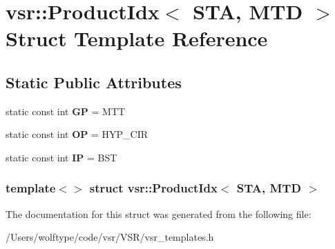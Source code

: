 \hypertarget{structvsr_1_1_product_idx_3_01_s_t_a_00_01_m_t_d_01_4}{\section{vsr\-:\-:Product\-Idx$<$ S\-T\-A, M\-T\-D $>$ Struct Template Reference}
\label{structvsr_1_1_product_idx_3_01_s_t_a_00_01_m_t_d_01_4}
}
\subsection*{Static Public Attributes}
\begin{DoxyCompactItemize}
\item 
\hypertarget{structvsr_1_1_product_idx_3_01_s_t_a_00_01_m_t_d_01_4_a3eed6b1fdbce00570e53f3b92133e757}{static const int {\bfseries G\-P} = M\-T\-T}\label{structvsr_1_1_product_idx_3_01_s_t_a_00_01_m_t_d_01_4_a3eed6b1fdbce00570e53f3b92133e757}

\item 
\hypertarget{structvsr_1_1_product_idx_3_01_s_t_a_00_01_m_t_d_01_4_a6d242481a21942e78ea100a0b95019d3}{static const int {\bfseries O\-P} = H\-Y\-P\-\_\-\-C\-I\-R}\label{structvsr_1_1_product_idx_3_01_s_t_a_00_01_m_t_d_01_4_a6d242481a21942e78ea100a0b95019d3}

\item 
\hypertarget{structvsr_1_1_product_idx_3_01_s_t_a_00_01_m_t_d_01_4_aa5fbd4fec9e645f25d5087c66754441e}{static const int {\bfseries I\-P} = B\-S\-T}\label{structvsr_1_1_product_idx_3_01_s_t_a_00_01_m_t_d_01_4_aa5fbd4fec9e645f25d5087c66754441e}

\end{DoxyCompactItemize}
\subsubsection*{template$<$$>$ struct vsr\-::\-Product\-Idx$<$ S\-T\-A, M\-T\-D $>$}



The documentation for this struct was generated from the following file\-:\begin{DoxyCompactItemize}
\item 
/\-Users/wolftype/code/vsr/\-V\-S\-R/vsr\-\_\-templates.\-h\end{DoxyCompactItemize}
